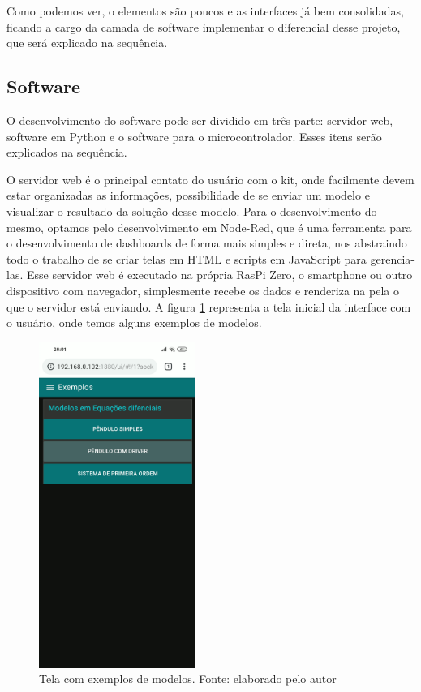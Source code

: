 \documentclass[journal]{IEEEtranTIE}
\begin{document}
Como podemos ver, o elementos são poucos e as interfaces já bem consolidadas, ficando a cargo da camada de software implementar o diferencial desse projeto, que será explicado na sequência.

\subsection{Software}

O desenvolvimento do software pode ser dividido em três parte: servidor web, software em Python e o software para o microcontrolador. Esses itens serão explicados na sequência.

O servidor web é o principal contato do usuário com o kit, onde facilmente devem estar organizadas as informações, possibilidade de se enviar um modelo e visualizar o resultado da solução desse modelo. Para o desenvolvimento do mesmo, optamos pelo desenvolvimento em Node-Red, que é uma ferramenta para o desenvolvimento de dashboards de forma mais simples e direta, nos abstraindo todo o trabalho de se criar telas em HTML e scripts em JavaScript para gerencia-las. Esse servidor web é executado na própria RasPi Zero, o smartphone ou outro dispositivo com navegador, simplesmente recebe os dados e renderiza na pela o que o servidor está enviando. A figura \ref{fig:examples} representa a tela inicial da interface com o usuário, onde temos alguns exemplos de modelos.

\begin{figure}[!h]
	\centering
	\includegraphics[width=5.1cm]{img/examples.png}
    \caption{Tela com exemplos de modelos. Fonte: elaborado pelo autor}
    \label{fig:examples}
\end{figure}
\end{document}
